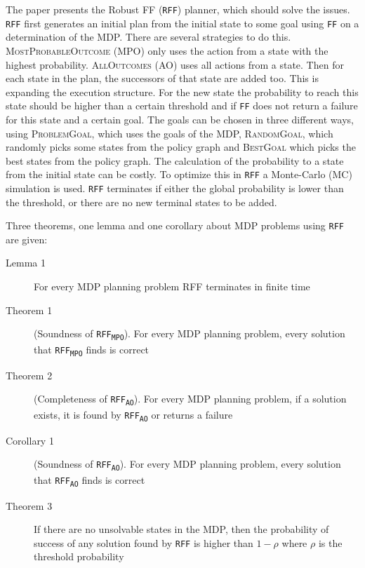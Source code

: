 \documentclass[runningheads,a4paper]{llncs}
\begin{document}
The paper presents the Robust FF (\texttt{RFF}) planner, which should solve the
issues. \texttt{RFF} first generates an initial plan from the initial state to
some goal using \texttt{FF} on a determination of the MDP\@. There are several
strategies to do this. \textsc{MostProbableOutcome} (MPO) only uses the action
from a state with the highest probability. \textsc{AllOutcomes} (AO) uses all
actions from a state. Then for each state in the plan, the successors of that
state are added too. This is expanding the execution structure. For the new
state the probability to reach this state should be higher than a certain
threshold and if \texttt{FF} does not return a failure for this state and a
certain goal. The goals can be chosen in three different ways, using
\textsc{ProblemGoal}, which uses the goals of the MDP, \textsc{RandomGoal},
which randomly picks some states from the policy graph and \textsc{BestGoal}
which picks the best states from the policy graph. The calculation of the
probability to a state from the initial state can be costly. To optimize this
in \texttt{RFF} a Monte-Carlo (MC) simulation is used. \texttt{RFF} terminates
if either the global probability is lower than the threshold, or there are no
new terminal states to be added.

Three theorems, one lemma and one corollary about MDP problems using
\texttt{RFF} are given:

\begin{description}
	\item[Lemma 1] For every MDP planning problem RFF terminates in
		finite time
	\item[Theorem 1] (Soundness of \texttt{RFF\textsubscript{MPO}}). For every
		MDP planning problem, every solution that
		\texttt{RFF\textsubscript{MPO}} finds is correct
	\item[Theorem 2] (Completeness of \texttt{RFF\textsubscript{AO}}). For
		every MDP planning problem, if a solution exists, it is found by
		\texttt{RFF\textsubscript{AO}} or returns a failure
	\item[Corollary 1] (Soundness of \texttt{RFF\textsubscript{AO}}). For every
		MDP planning problem, every solution that
		\texttt{RFF\textsubscript{AO}} finds is correct
	\item[Theorem 3] If there are no unsolvable states in the MDP, then the
		probability of success of any solution found by \texttt{RFF} is
		higher than $1 - \rho$ where $\rho$ is the threshold probability
\end{description}
\end{document}
